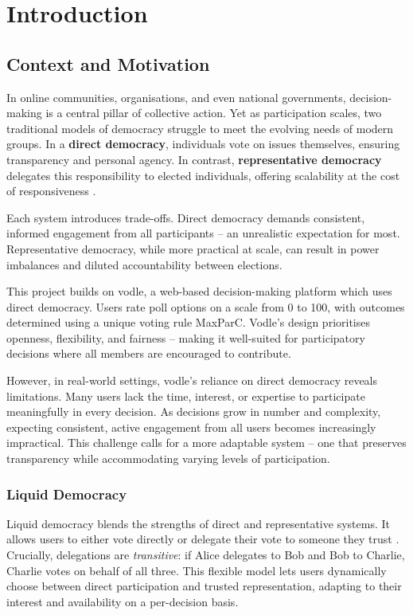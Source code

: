 \chapter{Introduction}\label{ch:introduction}

\section{Context and Motivation}

In online communities, organisations, and even national governments, decision-making is a central pillar of collective action. Yet as participation scales, two traditional models of democracy struggle to meet the evolving needs of modern groups. In a \textbf{direct democracy}, individuals vote on issues themselves, ensuring transparency and personal agency. In contrast, \textbf{representative democracy} delegates this responsibility to elected individuals, offering scalability at the cost of responsiveness \citep{ford_delegative_2002, blum_liquid_2016}.

Each system introduces trade-offs. Direct democracy demands consistent, informed engagement from all participants -- an unrealistic expectation for most. Representative democracy, while more practical at scale, can result in power imbalances and diluted accountability between elections.

This project builds on vodle, a web-based decision-making platform which uses direct democracy. Users rate poll options on a scale from 0 to 100, with outcomes determined using a unique voting rule MaxParC. Vodle's design prioritises openness, flexibility, and fairness -- making it well-suited for participatory decisions where all members are encouraged to contribute.

However, in real-world settings, vodle's reliance on direct democracy reveals limitations. Many users lack the time, interest, or expertise to participate meaningfully in every decision. As decisions grow in number and complexity, expecting consistent, active engagement from all users becomes increasingly impractical. This challenge calls for a more adaptable system -- one that preserves transparency while accommodating varying levels of participation.

\subsection{Liquid Democracy}

Liquid democracy blends the strengths of direct and representative systems. It allows users to either vote directly or delegate their vote to someone they trust \citep{blum_liquid_2016}. Crucially, delegations are \textit{transitive}: if Alice delegates to Bob and Bob to Charlie, Charlie votes on behalf of all three. This flexible model lets users dynamically choose between direct participation and trusted representation, adapting to their interest and availability on a per-decision basis.


